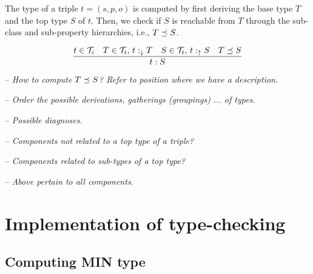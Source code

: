 \documentclass[runningheads]{llncs}
\newcommand{\darr}{\downarrow}
\newcommand{\uarr}{\uparrow}
\newcommand{\T}{{\cal T}}
\newcommand{\memo}[1]{}
\newcommand{\notes}[1]{\noindent\begin{small}-- \emph{#1}\hfill\break\end{small}}
\newcommand{\nnotes}[1]{\indent\begin{small}-- \emph{#1}\hfill\break\end{small}}
\begin{document}
The type of a triple $t=(s,p,o)$ is computed by first deriving the
base type $T$ and the top type $S$ of $t$. Then, we check if $S$ is
reachable from $T$ through the sub-class and sub-property hierarchies,
i.e., $T\preceq\/S$.

\begin{equation}
\label{rul:3-typing}
\dfrac{t\in\T_i\quad T\in\T_t,\, t:_{\darr}T\quad S\in\T_t,\, t:_\uarr\/S\quad T\preceq\/S}
      {t:S}
\end{equation}

\medskip

\medskip
\notes{How to compute $T\preceq\/S$? Refer to position where we have a description.}
\notes{Order the possible derivations, gatherings (groupings) ... of types.}

\notes{Possible diagnoses.}
\notes{Components not related to a top type of a triple?}
\notes{Components related to sub-types of a top type?}
\notes{Above pertain to all components.}



\memo{
\subsection{Typing a graph}

\notes{What is a type of a graph?}
\nnotes{A type of a graph is a graph!}
\nnotes{It includes a set of triple types forming a schema graph.}

\notes{Typing schema triples?}
\nnotes{What can be checked?}
\nnotes{Is a schema triple properly related to the super-classes and types of components.}
\nnotes{Consistency of the placement of a class in an ontology.}
\nnotes{A class or predicate component not related to other classes?}
\nnotes{A class or predicate component attached to ``conflicting'' set of classes? ?}
\nnotes{Any other examples?}

\notes{Typing a graph.}
\nnotes{Checking whether triple types match in the meeting points.}
\nnotes{What is the type in meeting points of two triple types?}
\nnotes{Since a tye of a graph should present any legal triple in $\D$}
}


\section{Implementation of type-checking}


\subsection{Computing MIN type\label{sec:alg-MIN}}
\end{document}
